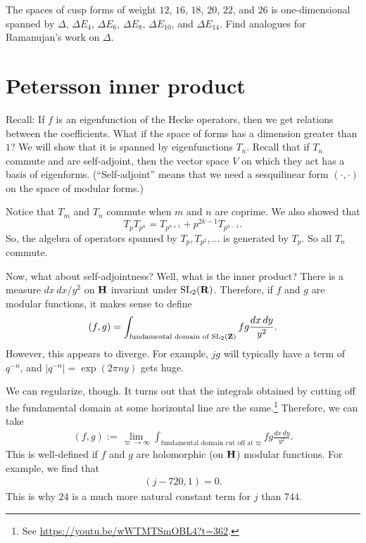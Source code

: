 \documentclass[11pt, oneside,margin=1in]{article}
\begin{document}
\begin{exercise}\label{}\text{}
The spaces of cusp forms of weight $12$, $16$, $18$, $20$, $22$, and $26$ is one-dimensional spanned by $\Delta$, $\Delta E_4$, $\Delta E_6$, $\Delta E_8$, $\Delta E_{10}$, and $\Delta E_{14}$. Find analogues for Ramanujan's work on $\Delta$.
\end{exercise}


\section{Petersson inner product}

Recall: If $f$ is an eigenfunction of the Hecke operators, then we get relations between the coefficients. What if the space of forms has a dimension greater than $1$? We will show that it is spanned by eigenfunctions $T_n$. Recall that if $T_n$ commute and are self-adjoint, then the vector space $V$ on which they act has a basis of eigenforms. (``Self-adjoint'' means that we need a sesquilinear form $(\cdot,\cdot)$ on the space of modular forms.)

Notice that $T_m$ and $T_n$ commute when $m$ and $n$ are coprime. We also showed that 
\[
	T_pT_{p^n} = T_{p^{n+1}} + p^{2k-1}T_{p^{n-1}}.
\]
So, the algebra of operators spanned by $T_p,T_{p^2},\hdots$ is generated by $T_p$. So all $T_n$ commute.

Now, what about self-adjointness? Well, what is the inner product? There is a measure $dx\,dx/y^2$ on $\mathbf H$ invariant under $\operatorname{SL}_{2}(\mathbf R)$. Therefore, if $f$ and $g$ are modular functions, it makes sense to define
\begin{align*}
	(f,g) =  \int_{\textrm{fundamental domain of $\operatorname{SL}_{2}(\mathbf Z)$}} fg\frac{dx\,dy}{y^2}. 
\end{align*}
However, this appears to diverge. For example, $jg$ will typically have a term of $q^{-n}$, and $\left\lvert q^{-n} \right\rvert = \exp(2\pi ny)$ gets huge.

We can regularize, though. It turns out that the integrals obtained by cutting off the fundamental domain at some horizontal line are the same.\footnote{See \url{https://youtu.be/wWTMTSmOBL4?t=362}.} Therefore, we can take
\begin{align*}
	(f,g) := \lim_{\varpi\to\infty}  \int_{\textrm{fundamental domain cut off at $\varpi$} }fg\frac{dx\,dy}{y^2}. 
\end{align*}
This is well-defined if $f$ and $g$ are holomorphic (on $\mathbf H$) modular functions. For example, we find that
\begin{align*}
	(j-720, 1) = 0.
\end{align*}
This is why $24$ is a much more natural constant term for $j$ than $744$.
\end{document}
